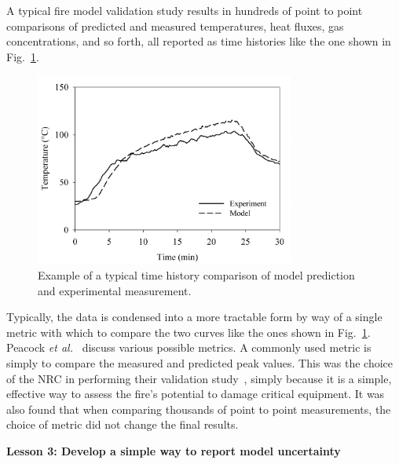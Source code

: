 \documentclass[fleqn,b5paper]{article}
\begin{document}
A typical fire model validation study results in hundreds of point to point comparisons of predicted and measured temperatures, heat fluxes, gas concentrations, and so forth, all reported as time histories like the one shown in Fig.~\ref{temp_history}.
\begin{figure}[ht]
\begin{center}
\includegraphics[height=2.5in]{../FDS_Validation_Guide/FIGURES/sample_time_history}
\end{center}
\caption[Sample time history plots.]{Example of a typical time history comparison of model prediction and experimental measurement.}
\label{temp_history}
\end{figure}
Typically, the data is condensed into a more tractable form by way of a single metric with which to compare the two curves like the ones shown in Fig.~\ref{temp_history}. Peacock {\em et al.}~\cite{Peacock:FSJ1999} discuss various possible metrics. A commonly used metric is simply to compare the measured and predicted peak values. This was the choice of the NRC in performing their validation study~\cite{NUREG_1824}, simply because it is a simple, effective way to assess the fire's potential to damage critical equipment. It was also found that when comparing thousands of point to point measurements, the choice of metric did not change the final results.



\vspace{\parskip}
{\bf Lesson 3: Develop a simple way to report model uncertainty}
\end{document}
